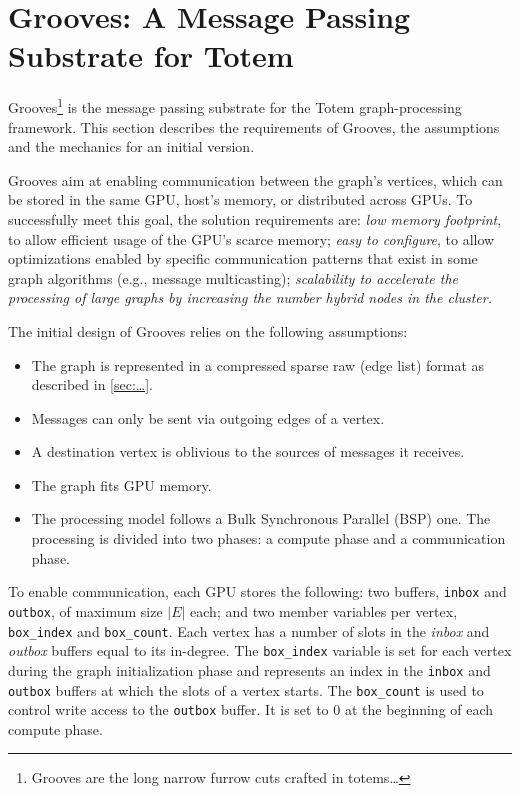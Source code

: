 \section{Grooves: A Message Passing Substrate for Totem}
\label{sec:grooves}

Grooves\footnote{Grooves are the long narrow furrow cuts crafted in totems…} is the message passing substrate for the Totem graph-processing framework. This section describes the requirements of Grooves, the assumptions and the mechanics for an initial version. 

Grooves aim at enabling communication between the graph’s vertices, which can be stored in the same GPU, host’s memory, or distributed across GPUs. To successfully meet this goal, the solution requirements are: \emph{low memory footprint}, to allow efficient usage of the GPU’s scarce memory; \emph{easy to configure}, to allow optimizations enabled by specific communication patterns that exist in some graph algorithms (e.g., message multicasting); \it{scalability} to accelerate the processing of large graphs by increasing the number hybrid nodes in the cluster.

The initial design of Grooves relies on the following assumptions: 
\begin{itemize}
\item The graph is represented in a compressed sparse raw (edge list) format as described in \ref{sec:…}.
\item Messages can only be sent via outgoing edges of a vertex.
\item A destination vertex is oblivious to the sources of messages it receives.
\item The graph fits GPU memory.
\item The processing model follows a Bulk Synchronous Parallel (BSP) one. The processing is divided into two phases: a compute phase and a communication phase.
\end{itemize}

To enable communication, each GPU stores the following: two buffers, \texttt{inbox} and \texttt{outbox}, of maximum size $|E|$ each; and two member variables per vertex, \texttt{box_index} and \texttt{box_count}. Each vertex has a number of slots in the \emph{inbox} and \emph{outbox} buffers equal to its in-degree. The \texttt{box_index} variable is set for each vertex during the graph initialization phase and represents an index in the \texttt{inbox} and \texttt{outbox} buffers at which the slots of a vertex starts. The \texttt{box_count} is used to control write access to the \texttt{outbox} buffer. It is set to 0 at the beginning of each compute phase. 

